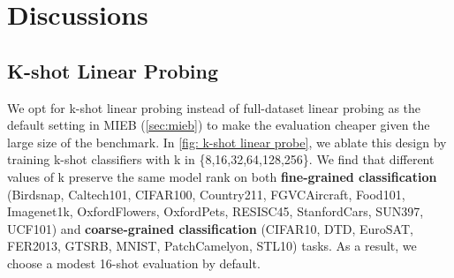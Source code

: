 \section{Discussions}

\subsection{K-shot Linear Probing}
\label{subsec: k-shot}

We opt for k-shot linear probing instead of full-dataset linear probing as the default setting in MIEB (\autoref{sec:mieb}) to make the evaluation cheaper given the large size of the benchmark. In \autoref{fig: k-shot linear probe}, we ablate this design by training k-shot classifiers with k in \{8,16,32,64,128,256\}. We find that different values of k preserve the same model rank on both \textbf{fine-grained classification} (Birdsnap, Caltech101, CIFAR100, Country211, FGVCAircraft, Food101, Imagenet1k, OxfordFlowers, OxfordPets, RESISC45, StanfordCars, SUN397, UCF101) and \textbf{coarse-grained classification} (CIFAR10, DTD, EuroSAT, FER2013, GTSRB, MNIST, PatchCamelyon, STL10) tasks. As a result, we choose a modest 16-shot evaluation by default.

